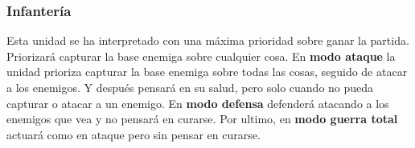 \subsubsection{Infantería}

Esta unidad se ha interpretado con una máxima prioridad sobre ganar la partida. Priorizará capturar la base enemiga sobre cualquier cosa. En \textbf{modo ataque} la unidad prioriza capturar la base enemiga sobre todas las cosas, seguido de atacar a los enemigos. Y después pensará en su salud, pero solo cuando no pueda capturar o atacar a un enemigo. En \textbf{modo defensa} defenderá atacando a los enemigos que vea y no pensará en curarse. Por ultimo, en \textbf{modo guerra total} actuará como en ataque pero sin pensar en curarse.

\begin{figure}[H]
    \centering
\end{figure}
